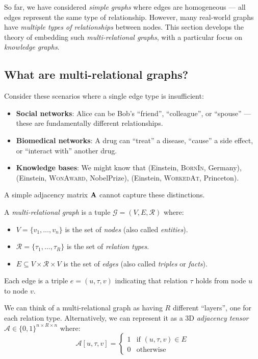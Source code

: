 \begin{notechapter}
So far, we have considered \emph{simple graphs} where edges are homogeneous --- all edges represent the same type of relationship. However, many real-world graphs have \emph{multiple types of relationships} between nodes. This section develops the theory of embedding such \emph{multi-relational graphs}, with a particular focus on \emph{knowledge graphs}.

\subsection{What are multi-relational graphs?}

\begin{intuition}[Motivation]
Consider these scenarios where a single edge type is insufficient:
\begin{itemize}
    \item \textbf{Social networks}: Alice can be Bob's ``friend'', ``colleague'', or ``spouse'' --- these are fundamentally different relationships.
    \item \textbf{Biomedical networks}: A drug can ``treat'' a disease, ``cause'' a side effect, or ``interact with'' another drug.
    \item \textbf{Knowledge bases}: We might know that (Einstein, \textsc{BornIn}, Germany), (Einstein, \textsc{WonAward}, NobelPrize), (Einstein, \textsc{WorkedAt}, Princeton).
\end{itemize}
A simple adjacency matrix $\mathbf{A}$ cannot capture these distinctions.
\end{intuition}

\begin{definition}
A \emph{multi-relational graph} is a tuple $\mathcal{G} = (V, E, \mathcal{R})$ where:
\begin{itemize}
    \item $V = \{v_1, \ldots, v_n\}$ is the set of \emph{nodes} (also called \emph{entities}).
    \item $\mathcal{R} = \{\tau_1, \ldots, \tau_R\}$ is the set of \emph{relation types}.
    \item $E \subseteq V \times \mathcal{R} \times V$ is the set of \emph{edges} (also called \emph{triples} or \emph{facts}).
\end{itemize}
Each edge is a triple $e = (u, \tau, v)$ indicating that relation $\tau$ holds from node $u$ to node $v$.
\end{definition}

\begin{intuition}
We can think of a multi-relational graph as having $R$ different ``layers'', one for each relation type. Alternatively, we can represent it as a 3D \emph{adjacency tensor} $\mathcal{A} \in \{0,1\}^{n \times R \times n}$ where:
\[
\mathcal{A}[u, \tau, v] = \begin{cases} 1 & \text{if } (u, \tau, v) \in E \\ 0 & \text{otherwise} \end{cases}
\]
\end{intuition}


\end{notechapter}

